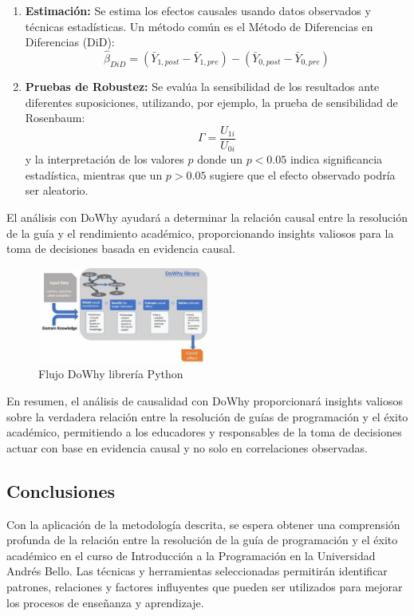 \begin{enumerate}
    \item \textbf{Estimación:} Se estima los efectos causales usando datos observados y técnicas estadísticas. Un método común es el Método de Diferencias en Diferencias (DiD):
    \begin{equation}
        \hat{\beta}_{DiD} = (\bar{Y}_{1,post} - \bar{Y}_{1,pre}) - (\bar{Y}_{0,post} - \bar{Y}_{0,pre})
    \end{equation}

    \item \textbf{Pruebas de Robustez:} Se evalúa la sensibilidad de los resultados ante diferentes suposiciones, utilizando, por ejemplo, la prueba de sensibilidad de Rosenbaum:
    \begin{equation}
        \Gamma = \frac{U_{1i}}{U_{0i}}
    \end{equation}
    y la interpretación de los valores \( p \) donde un \( p < 0.05 \) indica significancia estadística, mientras que un \( p > 0.05 \) sugiere que el efecto observado podría ser aleatorio.
\end{enumerate}

El análisis con DoWhy ayudará a determinar la relación causal entre la resolución de la guía y el rendimiento académico, proporcionando insights valiosos para la toma de decisiones basada en evidencia causal.

\begin{figure}[H]
  \centering
  \includegraphics[width=0.5\textwidth]{img/dowhy.jpg}
  \caption{Flujo DoWhy librería Python}
  \label{fig:dowhy_lib}
\end{figure}


En resumen, el análisis de causalidad con DoWhy proporcionará insights valiosos sobre la verdadera relación entre la resolución de guías de programación y el éxito académico, permitiendo a los educadores y responsables de la toma de decisiones actuar con base en evidencia causal y no solo en correlaciones observadas.


\subsection{Conclusiones}

Con la aplicación de la metodología descrita, se espera obtener una comprensión profunda de la relación entre la resolución de la guía de programación y el éxito académico en el curso de Introducción a la Programación en la Universidad Andrés Bello. Las técnicas y herramientas seleccionadas permitirán identificar patrones, relaciones y factores influyentes que pueden ser utilizados para mejorar los procesos de enseñanza y aprendizaje.